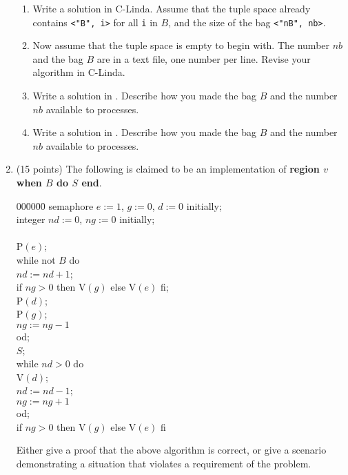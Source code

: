 \begin{enumerate}
\begin{enumerate}

\item 
Write a solution in C-Linda.  Assume that the tuple space already
contains {\tt <"B", i>} for all {\tt i} in $B$, and the size of the
bag {\tt <"nB", nb>}.  

\item 
Now assume that the tuple space is empty to begin with.  The number
$nb$ and the bag $B$ are in a text file, one number per line.
Revise your algorithm in C-Linda.


\item 
Write a solution in \CSP.  Describe how 
you made the bag $B$ and the number $nb$ available to processes.

\item 
Write a solution in \SR.  Describe how you made the bag $B$ and the
number $nb$ available to processes.

\end{enumerate}

\item (15 points)
The following is claimed to be an implementation of {\bf region $v$
when $B$ do $S$ end}.

{\bf
\begin{tabbing}
00\=00\=00\=\kill
semaphore $e := 1$, $g := 0$, $d := 0$ initially;\\
integer $nd := 0$, $ng := 0$ initially;\\
\\
P$(e)$;\\
while not $B$ do\+\\
  $nd := nd + 1$;\\
  if $ng > 0$ then V$(g)$ else V$(e)$ fi;\\
  P$(d)$;\\
  P$(g)$;\\
  $ng := ng - 1$\-\\
od;\\
$S$;\\
while $nd > 0$ do\+\\
  V$(d)$;\\
  $nd := nd - 1$;\\
  $ng := ng + 1$\-\\
od;\\
if $ng > 0$ then V$(g)$ else V$(e)$ fi\\
\end{tabbing}
}

\noindent
Either give a proof that the above algorithm is correct, or give a
scenario demonstrating a situation that violates a requirement of
the problem.

\end{enumerate}

